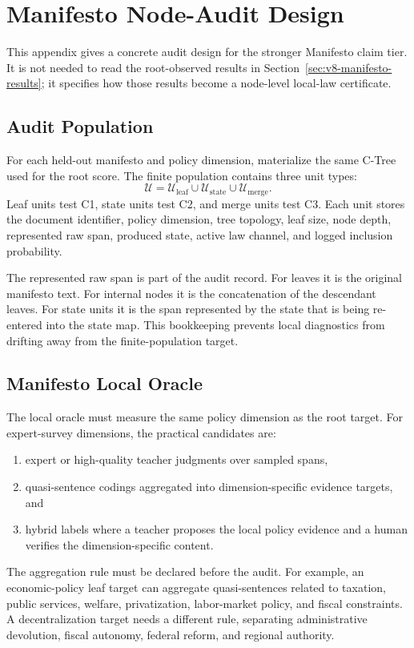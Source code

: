 \section{Manifesto Node-Audit Design}
\label{app:v8-manifesto-audit-design}

This appendix gives a concrete audit design for the stronger Manifesto claim
tier. It is not needed to read the root-observed results in
Section~\ref{sec:v8-manifesto-results}; it specifies how those results become
a node-level local-law certificate.

\subsection{Audit Population}

For each held-out manifesto and policy dimension, materialize the same C-Tree
used for the root score. The finite population contains three unit types:
\[
  \mathcal U
  =
  \mathcal U_{\mathrm{leaf}}
  \cup
  \mathcal U_{\mathrm{state}}
  \cup
  \mathcal U_{\mathrm{merge}} .
\]
Leaf units test C1, state units test C2, and merge units test C3. Each unit
stores the document identifier, policy dimension, tree topology, leaf size,
node depth, represented raw span, produced state, active law channel, and
logged inclusion probability.

The represented raw span is part of the audit record. For leaves it is the
original manifesto text. For internal nodes it is the concatenation of the
descendant leaves. For state units it is the span represented by the state that
is being re-entered into the state map. This bookkeeping prevents local
diagnostics from drifting away from the finite-population target.

\subsection{Manifesto Local Oracle}

The local oracle must measure the same policy dimension as the root target.
For expert-survey dimensions, the practical candidates are:
\begin{enumerate}[leftmargin=1.5em]
  \item expert or high-quality teacher judgments over sampled spans,
  \item quasi-sentence codings aggregated into dimension-specific evidence
        targets, and
  \item hybrid labels where a teacher proposes the local policy evidence and a
        human verifies the dimension-specific content.
\end{enumerate}
The aggregation rule must be declared before the audit. For example, an
economic-policy leaf target can aggregate quasi-sentences related to taxation,
public services, welfare, privatization, labor-market policy, and fiscal
constraints. A decentralization target needs a different rule, separating
administrative devolution, fiscal autonomy, federal reform, and regional
authority.

